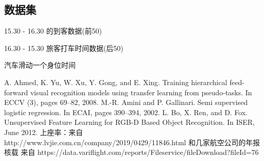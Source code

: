 \documentclass[UTF8]{ctexart}
\begin{document}
	\subsection{数据集}
	
	15.30 - 16.30 的到客数据(前50)
	 
	16.30 - 15.30 旅客打车时间数据(后50)
	
	汽车滑动一个身位时间

	\begin{flushleft}
		\begin{thebibliography}{123456}  
			\addtolength{\itemsep}{-1.5ex}
			A. Ahmed, K. Yu, W. Xu, Y. Gong, and E. Xing. Training hierarchical feed-forward visual recognition models using transfer learning from pseudo-tasks. In ECCV (3), pages 69–82, 2008.
			M.-R. Amini and P. Gallinari. Semi supervised logistic regression. In ECAI, pages 390–394, 2002.
			 L. Bo, X. Ren, and D. Fox. Unsupervised Feature Learning for RGB-D Based Object Recognition. In ISER, June 2012.
				上座率：来自 http://www.lvjie.com.cn/company/2019/0429/11846.html 和几家航空公司的年报
			 	核载 来自 https://data.variflight.com/reports/Fileservice/fileDownload?fileId=76
			
			
		\end{thebibliography} 
		
	\end{flushleft}
	
	
\end{document}
